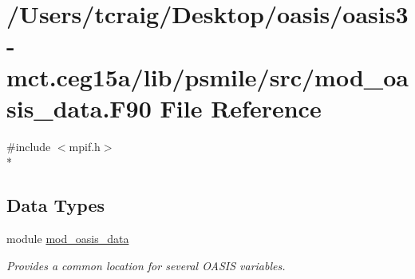 \hypertarget{mod__oasis__data_8_f90}{\section{/\+Users/tcraig/\+Desktop/oasis/oasis3-\/mct.ceg15a/lib/psmile/src/mod\+\_\+oasis\+\_\+data.F90 File Reference}
\label{mod__oasis__data_8_f90}
}
{\ttfamily \#include $<$mpif.\+h$>$}\\*
\subsection*{Data Types}
\begin{DoxyCompactItemize}
\item 
module \hyperlink{classmod__oasis__data}{mod\+\_\+oasis\+\_\+data}
\begin{DoxyCompactList}\small\item\em Provides a common location for several O\+A\+S\+I\+S variables. \end{DoxyCompactList}\end{DoxyCompactItemize}
